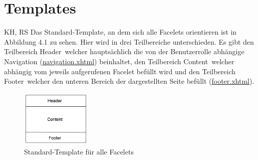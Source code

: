 		\section{Templates}
		KH, RS
		Das Standard-Template, an dem sich alle Facelets orientieren ist in Abbildung 4.1 zu sehen. Hier wird in drei Teilbereiche unterschieden. Es gibt den Teilbereich \glqq Header\grqq\, welcher hauptsächlich die von der Benutzerrolle abhängige Navigation (\hyperlink{navigation}{navigation.xhtml}) beinhaltet, den Teilbereich \glqq Content\grqq\, welcher abhängig vom jeweils aufgerufenen Facelet befüllt wird und den Teilbereich \glqq Footer\grqq\, welcher den unteren Bereich der dargestellten Seite befüllt (\hyperlink{footer}{footer.xhtml}).
		
		\begin{figure}[h]
			\centering
			\includegraphics[width=0.3\textwidth]{Grafiken/Template.png}
			\caption{Standard-Template für alle Facelets}
		\end{figure}
		
